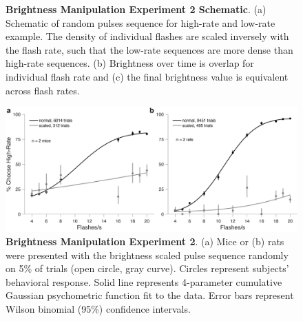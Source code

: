 \begin{figure}
  \caption[Brightness Manipulation Experiment 2 Schematic]{\textbf{Brightness Manipulation Experiment 2 Schematic}. (a) Schematic of random pulses sequence for high-rate and low-rate example. The density of individual flashes are scaled inversely with the flash rate, such that the low-rate sequences are more dense than high-rate sequences. (b) Brightness over time is overlap for individual flash rate and (c) the final brightness value is equivalent across flash rates. }
   \label{fig:brightness_sim_man}
\end{figure}

\begin{figure}
  \centering
  	\includegraphics[width=\textwidth]{Figures/chapter2/brightness_manipulation_2.png}
  \caption[Brightness Manipulation Experiment 2]{\textbf{Brightness Manipulation Experiment 2}. (a) Mice or (b) rats were presented with the brightness scaled  pulse sequence randomly on 5\% of trials (open circle, gray curve). Circles represent subjects' behavioral response. Solid line represents 4-parameter cumulative Gaussian psychometric function fit to the data. Error bars represent Wilson binomial (95\%) confidence intervals. }
   \label{fig:brightness_exp2}
\end{figure}
